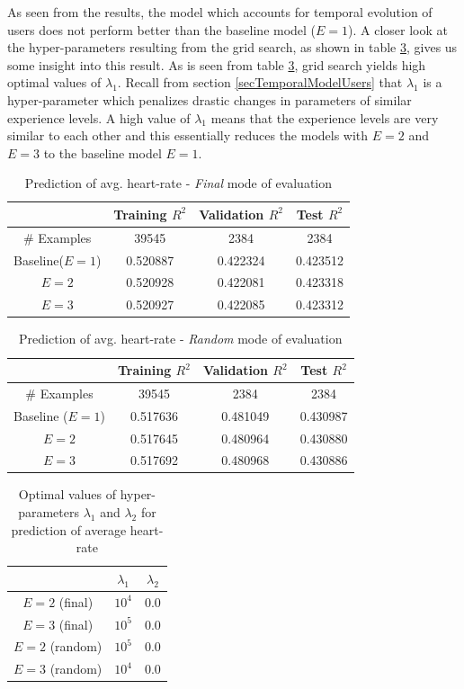 \documentclass{acm_proc_article-sp}
\begin{document}
As seen from the results, the model which accounts for temporal evolution of users does not perform better than the baseline model ($E = 1$). A closer look at the hyper-parameters resulting from the grid search, as shown in table \ref{tableAvgHrHyperparams}, gives us some insight into this result. As is seen from table \ref{tableAvgHrHyperparams}, grid search yields high optimal values of $\lambda_1$. Recall from section \ref{secTemporalModelUsers} that $\lambda_1$ is a hyper-parameter which penalizes drastic changes in parameters of similar experience levels. A high value of $\lambda_1$ means that the experience levels are very similar to each other and this essentially reduces the models with $E = 2$ and $E = 3$ to the baseline model $E = 1$.

\begin{table}[h]
\centering
\begin{tabular}{|c|c|c|c|} \hline
& Training $R^2$ & Validation $R^2$ & Test $R^2$ \\ \hline
\# Examples & 39545 & 2384 & 2384  \\ \hline
Baseline($E = 1$)& 0.520887 & 0.422324 & 0.423512 \\ \hline
$E = 2$ & 0.520928 & 0.422081 & 0.423318 \\ \hline
$E = 3$ & 0.520927 & 0.422085 & 0.423312 \\ \hline
\end{tabular}
\caption{Prediction of avg. heart-rate - \emph{Final} mode of evaluation }
\label{tableAvgHrFinal}
\end{table}

\begin{table}[h]
\centering
\begin{tabular}{|c|c|c|c|} \hline
& Training $R^2$ & Validation $R^2$ & Test $R^2$ \\ \hline
\# Examples & 39545 & 2384  &  2384 \\ \hline
Baseline ($E = 1$) & 0.517636 & 0.481049 & 0.430987 \\ \hline
$E = 2$  & 0.517645 & 0.480964 & 0.430880 \\ \hline
$E = 3$  & 0.517692 & 0.480968 & 0.430886 \\ \hline
\end{tabular}
\caption{Prediction of avg. heart-rate - \emph{Random} mode of evaluation }
\label{tableAvgHrRandom}
\end{table}

\begin{table}[h]
\centering
\begin{tabular}{|c|c|c|} \hline
& $\lambda_1$ & $\lambda_2$ \\ \hline
$E = 2$ (final) & $10^4$ & $0.0$ \\ \hline
$E = 3$ (final) & $10^5$ & $0.0$ \\ \hline
$E = 2$ (random) & $10^5$ & $0.0$ \\ \hline
$E = 3$ (random) & $10^4$ & $0.0$ \\ \hline
\end{tabular}
\caption{Optimal values of hyper-parameters $\lambda_1$ and $\lambda_2$ for prediction of average heart-rate}
\label{tableAvgHrHyperparams}
\end{table}
\end{document}
